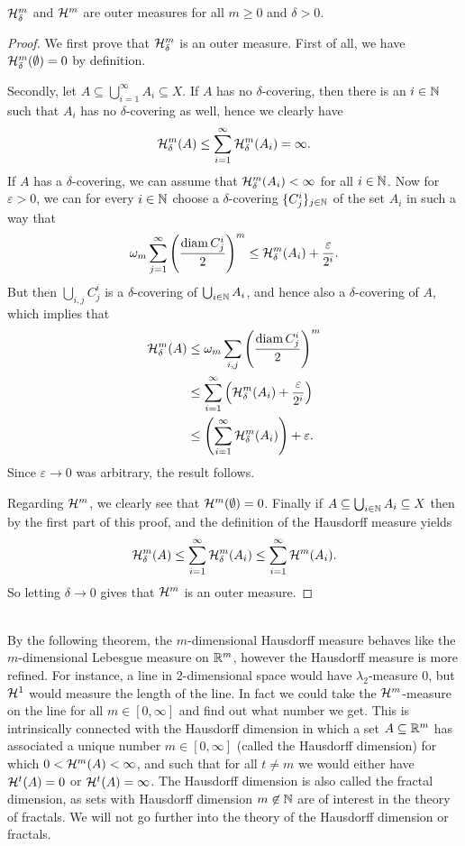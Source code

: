 \begin{theorem}
$\mathcal{H}^m_{\delta}$ and $\mathcal{H}^m$ are outer measures for all $m \ge 0$ and $\delta > 0$.
\end{theorem}
\begin{proof}
We first prove that $\mathcal{H}_{\delta}^m$ is an outer measure. First of all, we have $\mathcal{H}_{\delta}^m(\emptyset)=0$ by definition.

Secondly, let $A \subseteq \bigcup_{i=1}^{\infty}A_i \subseteq X$. If $A$ has no $\delta$-covering, then there is an $i \in \mathbb{N}$ such that $A_i$ has no $\delta$-covering as well, hence we clearly have
\[
    \mathcal{H}_{\delta}^m(A) \le \sum_{i=1}^{\infty}\mathcal{H}_{\delta}^m(A_i)=\infty.
\]
If $A$ has a $\delta$-covering, we can assume that $\mathcal{H}_{\delta}^m(A_i)<\infty$ for all $i \in \mathbb{N}$. Now for $\varepsilon > 0$, we can for every $i \in \mathbb{N}$ choose a $\delta$-covering $\{C_j^i\}_{j \in \mathbb{N}}$ of the set $A_i$ in such a way that
\[
    \omega_m \sum_{j=1}^{\infty}\left(\frac{\operatorname{diam} C_j^i}{2}\right)^m \le \mathcal{H}_{\delta}^m(A_i) + \frac{\varepsilon}{2^i}.
\]
But then $\bigcup_{i,j}C_j^i$ is a $\delta$-covering of $\bigcup_{i\in \mathbb{N}}A_i$, and hence also a $\delta$-covering of $A$, which implies that
\begin{align*}
    \mathcal{H}_{\delta}^m(A) &\le \omega_m \sum_{i,j} \left(\frac{\operatorname{diam} C_j^i}{2}\right)^m \\
    &\le \sum_{i=1}^{\infty} \left(\mathcal{H}_{\delta}^m(A_i) + \frac{\varepsilon}{2^i}\right) \\
    &\le \left(\sum_{i=1}^{\infty}\mathcal{H}_{\delta}^m(A_i)\right) + \varepsilon.
\end{align*}
Since $\varepsilon \to 0$ was arbitrary, the result follows.

Regarding $\mathcal{H}^m$, we clearly see that $\mathcal{H}^m(\emptyset)=0$. Finally if $A \subseteq \bigcup_{i \in \mathbb{N}}A_i \subseteq X$ then by the first part of this proof, and the definition of the Hausdorff measure yields
\[
    \mathcal{H}_{\delta}^m(A) \le \sum_{i=1}^{\infty}\mathcal{H}_{\delta}^m(A_i) \le \sum_{i=1}^{\infty}\mathcal{H}^m(A_i).
\]
So letting $\delta \to 0$ gives that $\mathcal{H}^m$ is an outer measure.
\end{proof}\\

By the following theorem, the $m$-dimensional Hausdorff measure behaves like the $m$-dimensional Lebesgue measure on $\mathbb{R}^m$, however the Hausdorff measure is more refined. For instance, a line in 2-dimensional space would have $\lambda_2$-measure 0, but $\mathcal{H}^1$ would measure the length of the line. In fact we could take the $\mathcal{H}^m$-measure on the line for all $m \in [0,\infty]$ and find out what number we get. This is intrinsically connected with the Hausdorff dimension in which a set $A \subseteq \mathbb{R}^m$ has associated a unique number $m \in [0,\infty]$ (called the Hausdorff dimension) for which $0<\mathcal{H}^m(A)<\infty$, and such that for all $t \neq m$ we would either have $\mathcal{H}^t(A)=0$ or $\mathcal{H}^t(A) = \infty$. The Hausdorff dimension is also called the fractal dimension, as sets with Hausdorff dimension $m \not \in \mathbb{N}$ are of interest in the theory of fractals. We will not go further into the theory of the Hausdorff dimension or fractals.


